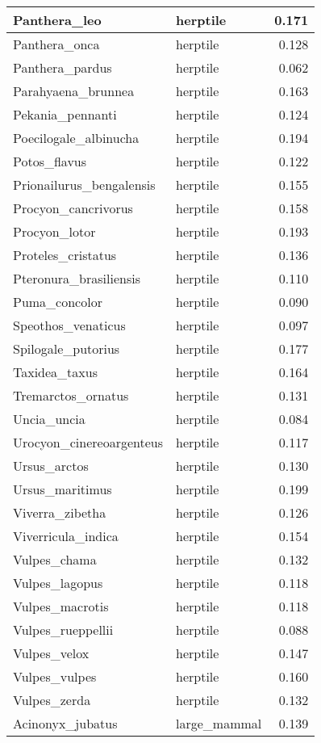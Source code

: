 \begin{table}
\begin{tabular}[t]{l|l|r}
\hline
Panthera\_leo & herptile & 0.171\\
\hline
Panthera\_onca & herptile & 0.128\\
\hline
Panthera\_pardus & herptile & 0.062\\
\hline
Parahyaena\_brunnea & herptile & 0.163\\
\hline
Pekania\_pennanti & herptile & 0.124\\
\hline
Poecilogale\_albinucha & herptile & 0.194\\
\hline
Potos\_flavus & herptile & 0.122\\
\hline
Prionailurus\_bengalensis & herptile & 0.155\\
\hline
Procyon\_cancrivorus & herptile & 0.158\\
\hline
Procyon\_lotor & herptile & 0.193\\
\hline
Proteles\_cristatus & herptile & 0.136\\
\hline
Pteronura\_brasiliensis & herptile & 0.110\\
\hline
Puma\_concolor & herptile & 0.090\\
\hline
Speothos\_venaticus & herptile & 0.097\\
\hline
Spilogale\_putorius & herptile & 0.177\\
\hline
Taxidea\_taxus & herptile & 0.164\\
\hline
Tremarctos\_ornatus & herptile & 0.131\\
\hline
Uncia\_uncia & herptile & 0.084\\
\hline
Urocyon\_cinereoargenteus & herptile & 0.117\\
\hline
Ursus\_arctos & herptile & 0.130\\
\hline
Ursus\_maritimus & herptile & 0.199\\
\hline
Viverra\_zibetha & herptile & 0.126\\
\hline
Viverricula\_indica & herptile & 0.154\\
\hline
Vulpes\_chama & herptile & 0.132\\
\hline
Vulpes\_lagopus & herptile & 0.118\\
\hline
Vulpes\_macrotis & herptile & 0.118\\
\hline
Vulpes\_rueppellii & herptile & 0.088\\
\hline
Vulpes\_velox & herptile & 0.147\\
\hline
Vulpes\_vulpes & herptile & 0.160\\
\hline
Vulpes\_zerda & herptile & 0.132\\
\hline
Acinonyx\_jubatus & large\_mammal & 0.139\\

\end{tabular}
\end{table}
